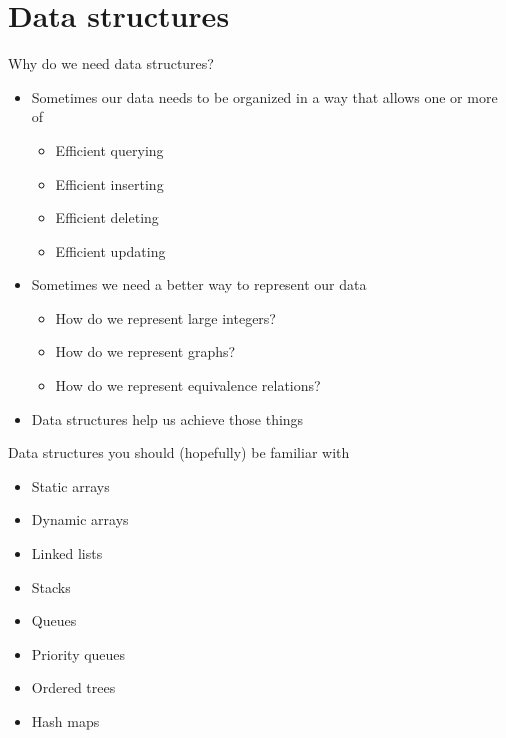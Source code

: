 \documentclass{beamer}
\begin{document}
\section*{Data structures}

\begin{frame}[plain]{Why do we need data structures?}
    \begin{itemize}
        \item Sometimes our data needs to be organized in a way that allows one or more of
            \begin{itemize}
                \item Efficient querying
                \item Efficient inserting
                \item Efficient deleting
                \item Efficient updating
            \end{itemize}
        \item Sometimes we need a better way to represent our data
            \begin{itemize}
                \item How do we represent large integers?
                \item How do we represent graphs?
                \item How do we represent equivalence relations?
            \end{itemize}

        \item Data structures help us achieve those things
    \end{itemize}
\end{frame}

\begin{frame}[plain]{Data structures you should (hopefully) be familiar with}
    \begin{itemize}
    \item Static arrays 
    \item Dynamic arrays 
    \item Linked lists 
    \item Stacks 
    \item Queues 
    \item Priority queues 
    \item Ordered trees 
    \item Hash maps 
    \end{itemize}
\end{frame}
\end{document}
